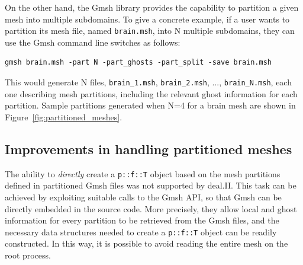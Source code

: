 \documentclass[a4paper,12pt]{article}
\begin{document}
\noindent On the other hand, the Gmsh library provides the capability to partition a given mesh
into multiple subdomains. To give a concrete example, if a user
wants to partition its mesh file, named \texttt{brain.msh}, into N multiple subdomains, they can use the Gmsh command line switches as follows:
\begin{lstlisting}[caption=Partitioning a .msh file via command line switches]
gmsh brain.msh -part N -part_ghosts -part_split -save brain.msh
\end{lstlisting}
This would generate N files, \texttt{brain\_1.msh}, \texttt{brain\_2.msh}, ..., \texttt{brain\_{N}.msh}, each one
describing mesh partitions, including the relevant ghost information for each partition. Sample partitions generated
when N=4 for a brain mesh are shown in Figure~\ref{fig:partitioned_meshes}.

\subsection{Improvements in handling partitioned meshes}
The ability to \emph{directly} create a \texttt{p::f::T} object based on the mesh partitions defined in partitioned Gmsh files was not supported
by deal.II. This task can be achieved by exploiting suitable calls to the Gmsh API, so that Gmsh can be directly
embedded in the source code. More precisely, they allow local and ghost information for every partition to be retrieved from
the Gmsh files, and the necessary data structures needed to create a \texttt{p::f::T} object can be readily constructed. In this
way, it is possible to avoid reading the entire mesh on the root process.
\end{document}
